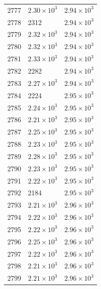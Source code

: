 \begin{table}[H]
\begin{tabular}{lll}
2777 & $\displaystyle 2.30 \times 10^{3}$ & $\displaystyle 2.94 \times 10^{3}$ \\
2778 & 2312 & $\displaystyle 2.94 \times 10^{3}$ \\
2779 & $\displaystyle 2.32 \times 10^{3}$ & $\displaystyle 2.94 \times 10^{3}$ \\
2780 & $\displaystyle 2.32 \times 10^{3}$ & $\displaystyle 2.94 \times 10^{3}$ \\
2781 & $\displaystyle 2.33 \times 10^{3}$ & $\displaystyle 2.94 \times 10^{3}$ \\
2782 & 2282 & $\displaystyle 2.94 \times 10^{3}$ \\
2783 & $\displaystyle 2.27 \times 10^{3}$ & $\displaystyle 2.94 \times 10^{3}$ \\
2784 & 2224 & $\displaystyle 2.95 \times 10^{3}$ \\
2785 & $\displaystyle 2.24 \times 10^{3}$ & $\displaystyle 2.95 \times 10^{3}$ \\
2786 & $\displaystyle 2.21 \times 10^{3}$ & $\displaystyle 2.95 \times 10^{3}$ \\
2787 & $\displaystyle 2.25 \times 10^{3}$ & $\displaystyle 2.95 \times 10^{3}$ \\
2788 & $\displaystyle 2.23 \times 10^{3}$ & $\displaystyle 2.95 \times 10^{3}$ \\
2789 & $\displaystyle 2.28 \times 10^{3}$ & $\displaystyle 2.95 \times 10^{3}$ \\
2790 & $\displaystyle 2.23 \times 10^{3}$ & $\displaystyle 2.95 \times 10^{3}$ \\
2791 & $\displaystyle 2.22 \times 10^{3}$ & $\displaystyle 2.95 \times 10^{3}$ \\
2792 & 2184 & $\displaystyle 2.95 \times 10^{3}$ \\
2793 & $\displaystyle 2.21 \times 10^{3}$ & $\displaystyle 2.96 \times 10^{3}$ \\
2794 & $\displaystyle 2.22 \times 10^{3}$ & $\displaystyle 2.96 \times 10^{3}$ \\
2795 & $\displaystyle 2.22 \times 10^{3}$ & $\displaystyle 2.96 \times 10^{3}$ \\
2796 & $\displaystyle 2.25 \times 10^{3}$ & $\displaystyle 2.96 \times 10^{3}$ \\
2797 & $\displaystyle 2.22 \times 10^{3}$ & $\displaystyle 2.96 \times 10^{3}$ \\
2798 & $\displaystyle 2.21 \times 10^{3}$ & $\displaystyle 2.96 \times 10^{3}$ \\
2799 & $\displaystyle 2.21 \times 10^{3}$ & $\displaystyle 2.96 \times 10^{3}$ \\

\end{tabular}
\end{table}
